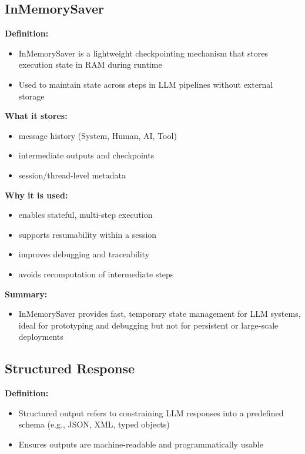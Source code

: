 \documentclass[10pt,a4paper]{article}
\begin{document}
\subsection{InMemorySaver}

\textbf{Definition:}
\begin{itemize}
\item InMemorySaver is a lightweight checkpointing mechanism that stores execution state in RAM during runtime
\item Used to maintain state across steps in LLM pipelines without external storage
\end{itemize}

\textbf{What it stores:}
\begin{itemize}
\item message history (System, Human, AI, Tool)
\item intermediate outputs and checkpoints
\item session/thread-level metadata
\end{itemize}

\textbf{Why it is used:}
\begin{itemize}
\item enables stateful, multi-step execution
\item supports resumability within a session
\item improves debugging and traceability
\item avoids recomputation of intermediate steps
\end{itemize}

\textbf{Summary:}
\begin{itemize}
\item InMemorySaver provides fast, temporary state management for LLM systems, ideal for prototyping and debugging but not for persistent or large-scale deployments
\end{itemize}


\subsection{Structured Response}
\textbf{Definition:}
\begin{itemize}
\item Structured output refers to constraining LLM responses into a predefined schema (e.g., JSON, XML, typed objects)
\item Ensures outputs are machine-readable and programmatically usable
\end{itemize}
\end{document}
